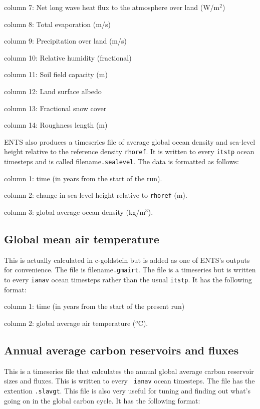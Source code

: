 \documentclass[10pt,a4paper]{report}
\begin{document}
column 7: Net long wave heat flux to the atmosphere over land
(W/m$^2$)

column 8: Total evaporation (m/s)

column 9: Precipitation over land (m/s)

column 10: Relative humidity (fractional)

column 11: Soil field capacity (m)

column 12: Land surface albedo

column 13: Fractional snow cover

column 14: Roughness length (m)

ENTS also produces a timeseries file of average global ocean density
and sea-level height relative to the reference density {\tt rhoref}.
It is written to every {\tt itstp} ocean timesteps and is called
filename{\tt.sealevel}. The data is formatted as follows:

column 1: time (in years from the start of the run).

column 2: change in sea-level height relative to {\tt rhoref} (m).

column 3: global average ocean density (kg/m$^3$).

\subsection{Global mean air temperature}

This is actually calculated in c-goldstein but is added as one of
ENTS's outputs for convenience. The file is filename{\tt.gmairt}.
The file is a timeseries but is written to every {\tt ianav} ocean
timesteps rather than the usual {\tt itstp}. It has the following
format:

column 1: time (in years from the start of the present run)

column 2: global average air temperature ($^{o}$C).

\subsection{Annual average carbon reservoirs and fluxes}

This is a timeseries file that calculates the annual global average
carbon reservoir sizes and fluxes. This is written to every {\tt
ianav} ocean timesteps. The file has the extention {\tt .slavgt}.
This file is also very useful for tuning and finding out what's
going on in the global carbon cycle. It has the following format:
\end{document}
